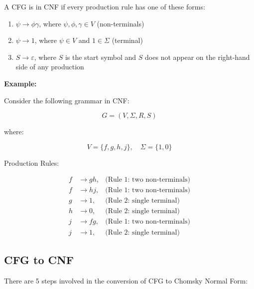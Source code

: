 \documentclass[12pt,a4paper,openany]{article}
\begin{document}
A CFG is in CNF if every production rule has one of these forms:

\begin{enumerate}
    \item $\psi \to \phi \gamma$, where $\psi, \phi, \gamma \in V$ (non-terminals)
    \item $\psi \to 1$, where $\psi \in V$ and $1 \in \Sigma$ (terminal)
    \item $S \to \varepsilon$, where $S$ is the start symbol and $S$ does not appear on the right-hand side of any production
\end{enumerate}

\textbf{Example:}

Consider the following grammar in CNF:

$$G = (V, \Sigma, R, S)$$

where:

\[V = \{f, g, h, j\}, \quad  \Sigma = \{1, 0\} \]

Production Rules:

\begin{align*}
    f &\to g h,  &\text{(Rule 1: two non-terminals)} \\
    f &\to h j,  &\text{(Rule 1: two non-terminals)} \\
    g &\to 1,  &\text{(Rule 2: single terminal)} \\
    h &\to 0, &\text{(Rule 2: single terminal)} \\
    j &\to f g, &\text{(Rule 1: two non-terminals)} \\
    j &\to 1, &\text{(Rule 2: single terminal)}
\end{align*}


\subsection{CFG to CNF}

There are 5 steps involved in the conversion of CFG to Chomsky Normal Form:
\end{document}
